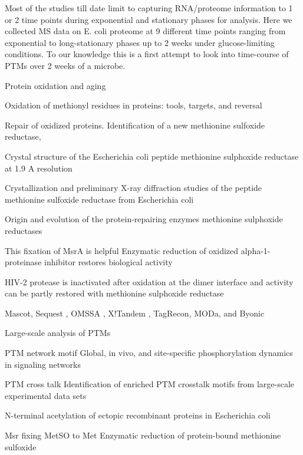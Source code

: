 \documentclass[12pt]{article}
\begin{document}
Most of the studies till date limit to capturing RNA/proteome information to 1 or 2 time points during exponential and stationary phases for analysis. Here we collected MS data on E. coli proteome at 9 different time points ranging from exponential to long-stationary phases up to 2 weeks under glucose-limiting conditions. To our knowledge this is a first attempt to look into time-course of PTMs over 2 weeks of a microbe.

\cite{Stadtman1992}
{Protein oxidation and aging}

\cite{Vogt1995}
{Oxidation of methionyl residues in proteins: tools, targets, and reversal}

\cite{Grimaudetal2001}
{Repair of oxidized proteins. Identification of a new methionine sulfoxide reductase},

\cite{Tete-Favieretal2000}
{Crystal structure of the Escherichia coli peptide methionine sulphoxide reductase at 1.9 A resolution}
   
\cite{Tete-Favieretal2000b}
{Crystallization and preliminary X-ray diffraction studies of the peptide methionine sulfoxide reductase from Escherichia coli}
   
\cite{ZhangWeissbach2008}
{Origin and evolution of the protein-repairing enzymes methionine sulphoxide reductases}
   
This fixation of MsrA is helpful \cite{Abramsetal1981}
{Enzymatic reduction of oxidized alpha-1-proteinase inhibitor restores biological activity}

\cite{Davisetal2000}
{HIV-2 protease is inactivated after oxidation at the dimer interface and activity can be partly restored with methionine sulphoxide reductase}

Mascot\cite{Perkinsetal1999}, Sequest \cite{Engetal1994}, OMSSA \cite{Geeretal2004}, X!Tandem \cite{CraigBeavis2004}, TagRecon\cite{Dasarietal2010}, MODa\cite{Naetal2012}, and Byonic \cite{Bernetal2012}

Large-scale analysis of PTMs \cite{OlsenMann2013}

PTM network motif \cite{Olsenetal2006}
{Global, in vivo, and site-specific phosphorylation dynamics in signaling networks}

PTM cross talk \cite{Pengetal2014}
{Identification of enriched PTM crosstalk motifs from large-scale experimental data sets}

\cite{Charbautetal2002}
{N-terminal acetylation of ectopic recombinant proteins in Escherichia coli}

Msr fixing MetSO to Met \cite{Brotetal1981}
{Enzymatic reduction of protein-bound methionine sulfoxide}
\end{document}
